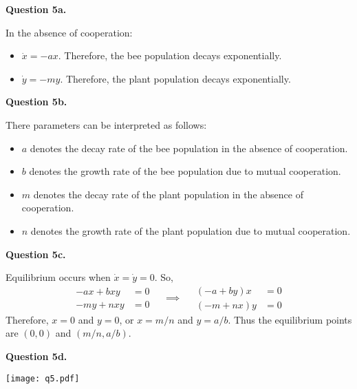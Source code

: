 \documentclass[11pt]{penrose}
\newenvironment{problem}[2][Question]{\textbf{#1 #2.}\par}{}
\begin{document}
\begin{problem}{5a}
    In the absence of cooperation:
    \begin{itemize}
        \item $\dot{x} = -ax$. Therefore, the bee population decays exponentially.
        \item $\dot{y} = -my$. Therefore, the plant population decays exponentially.
    \end{itemize}
\end{problem}

\begin{problem}{5b}
    There parameters can be interpreted as follows:
    \begin{itemize}
        \item $a$ denotes the decay rate of the bee population in the absence of cooperation.
        \item $b$ denotes the growth rate of the bee population due to mutual cooperation.
        \item $m$ denotes the decay rate of the plant population in the absence of cooperation.
        \item $n$ denotes the growth rate of the plant population due to mutual cooperation.
    \end{itemize}
\end{problem}

\begin{problem}{5c}
    Equilibrium occurs when $\dot{x} = \dot{y} = 0$. So,
    \begin{equation*}
        \begin{aligned}
            -ax + bxy &= 0\\
            -my + nxy &= 0
        \end{aligned}
        \quad\implies\quad
        \begin{aligned}
            (-a + by)x &= 0\\
            (-m + nx)y &= 0
        \end{aligned}
    \end{equation*}
    Therefore, $x=0$ and $y = 0$, or $x = m/n$ and $y = a/b$. Thus the equilibrium points are $(0,0)$ and $(m/n, a/b)$.
\end{problem}

\begin{problem}{5d}
    \begin{center}
        \texttt{[image: q5.pdf]}
    \end{center}
\end{problem}
\end{document}
